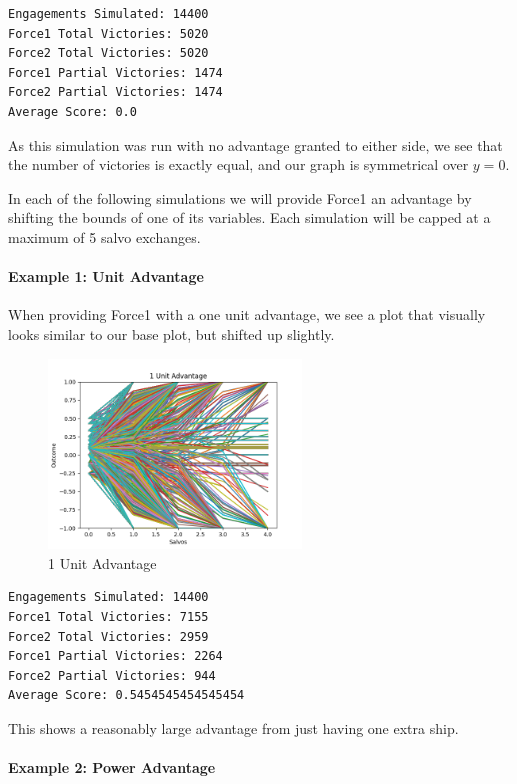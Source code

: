 \begin{verbatim}
Engagements Simulated: 14400
Force1 Total Victories: 5020
Force2 Total Victories: 5020
Force1 Partial Victories: 1474
Force2 Partial Victories: 1474
Average Score: 0.0
\end{verbatim}

As this simulation was run with no advantage granted to either side, we
see that the number of victories is exactly equal, and our graph is
symmetrical over \(y=0\).

In each of the following simulations we will provide Force1 an advantage
by shifting the bounds of one of its variables. Each simulation will be
capped at a maximum of 5 salvo exchanges.

\hypertarget{example-1-unit-advantage}{%
\paragraph{Example 1: Unit Advantage}\label{example-1-unit-advantage}}

When providing Force1 with a one unit advantage, we see a plot that
visually looks similar to our base plot, but shifted up slightly.

\begin{figure}
\hypertarget{fig:refname}{%
\centering
\includegraphics[width=0.6\textwidth,height=\textheight]{figures/1UnitAdv.png}
\caption{1 Unit Advantage}\label{fig:refname}
}
\end{figure}

\begin{verbatim}
Engagements Simulated: 14400
Force1 Total Victories: 7155
Force2 Total Victories: 2959
Force1 Partial Victories: 2264
Force2 Partial Victories: 944
Average Score: 0.5454545454545454
\end{verbatim}

This shows a reasonably large advantage from just having one extra ship.

\hypertarget{example-2-power-advantage}{%
\paragraph{Example 2: Power Advantage}\label{example-2-power-advantage}}

